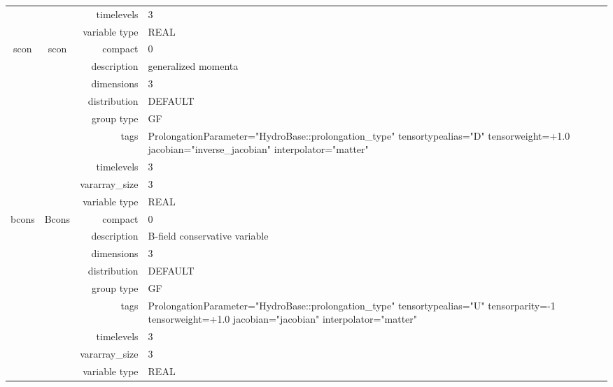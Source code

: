 \documentclass{article}
\begin{document}
\begin{tabular*}{150mm}{|c|c@{\extracolsep{\fill}}|rl|}
 &  & timelevels & 3 \\ 
 &  & variable type & REAL \\ 
\hline 
scon & scon & compact & 0 \\ 
 &  & description & generalized momenta \\ 
 &  & dimensions & 3 \\ 
 &  & distribution & DEFAULT \\ 
 &  & group type & GF \\ 
 &  & tags & ProlongationParameter="HydroBase::prolongation\_type" tensortypealias="D" tensorweight=+1.0 jacobian="inverse\_jacobian" interpolator="matter" \\ 
 &  & timelevels & 3 \\ 
 &  & vararray\_size & 3 \\ 
 &  & variable type & REAL \\ 
\hline 
bcons & Bcons & compact & 0 \\ 
 &  & description & B-field conservative variable \\ 
 &  & dimensions & 3 \\ 
 &  & distribution & DEFAULT \\ 
 &  & group type & GF \\ 
 &  & tags & ProlongationParameter="HydroBase::prolongation\_type" tensortypealias="U" tensorparity=-1 tensorweight=+1.0 jacobian="jacobian" interpolator="matter" \\ 
 &  & timelevels & 3 \\ 
 &  & vararray\_size & 3 \\ 
 &  & variable type & REAL \\ 
\hline 
\end{tabular*} 



\vspace{5mm}
\vspace{5mm}
\end{document}
